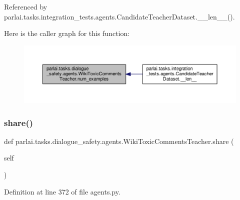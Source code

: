 Referenced by parlai.\+tasks.\+integration\+\_\+tests.\+agents.\+Candidate\+Teacher\+Dataset.\+\_\+\+\_\+len\+\_\+\+\_\+().

Here is the caller graph for this function\+:
\nopagebreak
\begin{figure}[H]
\begin{center}
\leavevmode
\includegraphics[width=350pt]{classparlai_1_1tasks_1_1dialogue__safety_1_1agents_1_1WikiToxicCommentsTeacher_a144791f29981c18666fa8725cc424ba8_icgraph}
\end{center}
\end{figure}
\mbox{\label{classparlai_1_1tasks_1_1dialogue__safety_1_1agents_1_1WikiToxicCommentsTeacher_a0d73b4cda0c165161393500459440b94}} 
\subsubsection{\texorpdfstring{share()}{share()}}
{\footnotesize\ttfamily def parlai.\+tasks.\+dialogue\+\_\+safety.\+agents.\+Wiki\+Toxic\+Comments\+Teacher.\+share (\begin{DoxyParamCaption}\item[{}]{self }\end{DoxyParamCaption})}



Definition at line 372 of file agents.\+py.



